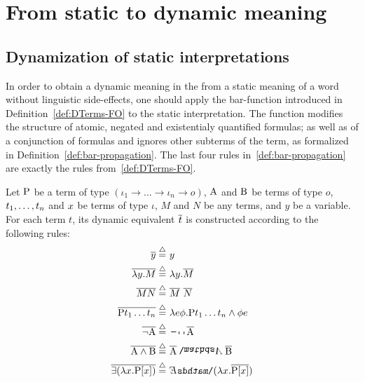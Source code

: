 \section{From static to dynamic meaning} \label{sec:examples}

\subsection{Dynamization of static interpretations}

In order to obtain a dynamic meaning in the {\FullName} from a static meaning of a word without linguistic side-effects, one should apply the bar-function introduced in Definition~\ref{def:DTerms-FO} to the static interpretation. The function modifies the structure of atomic, negated and existentialy quantified formulas; as well as of a conjunction of formulas and ignores other subterms of the term, as formalized in Definition~\ref{def:bar-propagation}. The last four rules in~\ref{def:bar-propagation} are exactly the rules from~\ref{def:DTerms-FO}. 

\begin{definition}[] \label{def:bar-propagation} 
Let $\P1$ be a term of type $(\iota_1 \rightarrow \dots \rightarrow \iota_n \rightarrow o)$, $\A1$ and $\B1$ be terms of type $o$, $\t1_1, \dots, \t1_n$ and $\x1$ be terms of type $\iota$, $M$ and $N$ be any terms, and $y$ be a variable. For each term $t$, its dynamic equivalent $\overline{t}$ is constructed according to the following rules:
\begin{subequations}
\begin{align}
\tr{ y} \defeq \ & y  \label{def:bar-var}\\
\tr{ \lambda y. M } \defeq \ & \lambda y. \tr{M} \label{def:bar-abs}\\
\tr{ M N  } \defeq \ & \tr{M} \ \tr{N} \label{def:bar-app} \\
\tr{ \P1 \t1_1 \dots \t1_n } \defeq \ & \lambda e \phi . \P1 \t1_1 \dots \t1_n \land \phi e  \label{def:bar-P}\\
\tr{ \neg \A1  } \defeq \ & \n2 \tr{\A1}  \label{def:bar-neg}\\
\tr{ \A1 \land \B1} \defeq \ & \tr{\A1} \cnj2 \tr{\B1}  \label{def:bar-cnj}\\
\tr{\exists( \lambda \x1. \P1 [\x1])} \defeq \ & \ex2( \lambda  \x1. \tr{\P1 [\x1]})  \label{def:bar-ex} 
\end{align}
\end{subequations} 
\end{definition}

